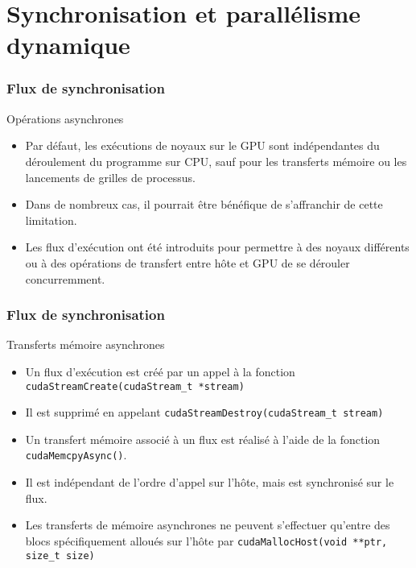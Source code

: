 \section{Synchronisation et parallélisme dynamique}
\begin{frame}
    \frametitle{Flux de synchronisation}
\begin{block}{Opérations asynchrones}
    \begin{itemize}
        \item<+-> Par défaut, les exécutions de noyaux sur le GPU sont indépendantes du déroulement
        du programme sur CPU, sauf pour les transferts mémoire ou les lancements de grilles de processus.
        \item<+-> Dans de nombreux cas, il pourrait être bénéfique de s'affranchir de cette limitation.
        \item<+-> Les flux d'exécution ont été introduits pour permettre à des noyaux différents ou à des opérations
        de transfert entre hôte et GPU de se dérouler concurremment. 
    \end{itemize}
\end{block}
\end{frame}
\begin{frame}[fragile]
    \frametitle{Flux de synchronisation}
\begin{block}{Transferts mémoire asynchrones}
    \begin{itemize}
        \item<+-> Un flux d'exécution est créé par un appel à la fonction \texttt{cudaStreamCreate(cudaStream\_t *stream)}
        \item<+-> Il est supprimé en appelant \texttt{cudaStreamDestroy(cudaStream\_t stream)}
        \item<+-> Un transfert mémoire associé à un flux est réalisé à l'aide de la fonction \texttt{cudaMemcpyAsync()}.
        \item<+-> Il est indépendant de l'ordre d'appel sur l'hôte, mais est synchronisé sur le flux.
        \item<+-> Les transferts de mémoire asynchrones ne peuvent s'effectuer qu'entre des blocs spécifiquement alloués sur l'hôte par 
        \texttt{cudaMallocHost(void **ptr, size\_t size)}
    \end{itemize}
\end{block}
\end{frame}
